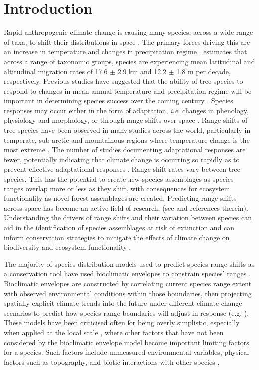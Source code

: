\documentclass[a4paper, 11pt]{article}
\begin{document}
\section{Introduction}
Rapid anthropogenic climate change is causing many species, across a wide range of taxa, to shift their distributions in space \citep{Hughes2000, Parmesan2006, Chen2011}. The primary forces driving this are an increase in temperature and changes in precipitation regime \citep{Corlett2013, McCain2011}. \citet{Chen2011} estimates that across a range of taxonomic groups, species are experiencing mean latitudinal and altitudinal migration rates of 17.6 $\pm$ 2.9 km and 12.2 $\pm$ 1.8 m per decade, respectively. Previous studies have suggested that the ability of tree species to respond to changes in mean annual temperature and precipitation regime will be important in determining species success over the coming century \citep{Colwell2008, Chen2011, Feeley2012}. Species responses may occur either in the form of adaptation, \textit{i.e.} changes in phenology, physiology and morphology, or through range shifts over space \citep{Bellard2012}. Range shifts of tree species have been observed in many studies across the world, particularly in temperate, sub-arctic and mountainous regions \citep{} where temperature change is the most extreme \citep{}. The number of studies documenting adaptational responses are fewer, potentially indicating that climate change is occurring so rapidly as to prevent effective adaptational responses \citep{}. Range shift rates vary between tree species. This has the potential to create new species assemblages as species ranges overlap more or less as they shift, with consequences for ecosystem functionality as novel forest assemblages are created. Predicting range shifts across space has become an active field of research, (see \citealt{Bellard2012} and references therein). Understanding the drivers of range shifts and their variation between species can aid in the identification of species assemblages at risk of extinction and can inform conservation strategies to mitigate the effects of climate change on biodiversity and ecosystem functionality \citep{}.

The majority of species distribution models used to predict species range shifts as a conservation tool have used bioclimatic envelopes to constrain species' ranges \citep{Pearson2003, Sinclair2010}. Bioclimatic envelopes are constructed by correlating current species range extent with observed environmental conditions within those boundaries, then projecting spatially explicit climate trends into the future under different climate change scenarios to predict how species range boundaries will adjust in response (e.g. \citealt{Berry2002, Peterson2002, Thuiller2005, Araujo2006}). These models have been criticised often for being overly simplistic, especially when applied at the local scale \citep{}, where other factors that have not been considered by the bioclimatic envelope model become important limiting factors for a species. Such factors include unmeasured environmental variables, physical factors such as topography, and biotic interactions with other species \citep{Davis1998, Putten2010, Ettinger2011}. 
\end{document}
